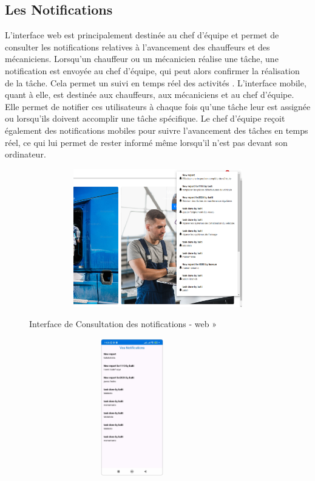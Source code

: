 \subsection{Les Notifications}

L'interface web est principalement destinée au chef d'équipe et permet de consulter les notifications relatives à l'avancement des chauffeurs et des mécaniciens. Lorsqu'un chauffeur ou un mécanicien réalise une tâche, une notification est envoyée au chef d'équipe, qui peut alors confirmer la réalisation de la tâche. Cela permet un suivi en temps réel des activités . L'interface mobile, quant à elle, est destinée aux chauffeurs, aux mécaniciens et au chef d'équipe. Elle permet de notifier ces utilisateurs à chaque fois qu'une tâche leur est assignée ou lorsqu'ils doivent accomplir une tâche spécifique. Le chef d'équipe reçoit également des notifications mobiles pour suivre l'avancement des tâches en temps réel, ce qui lui permet de rester informé même lorsqu'il n'est pas devant son ordinateur.


\begin{figure}[h!]
    \centering
    \begin{minipage}[t]{0.62\textwidth}
        \centering
        \includegraphics[width=1\textwidth, height=6cm]{chap5.images/notif web.png}
        \caption{Interface de Consultation des notifications - web »}
    \end{minipage}
    \hfill
    \begin{minipage}[t]{0.35\textwidth}
        \centering
        \includegraphics[width=0.8\textwidth, height=6cm]{chap5.images/notif mobile.png}
        \caption{}
    \end{minipage}
\end{figure}




